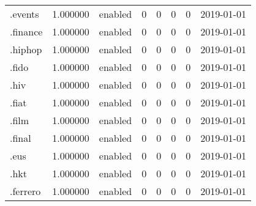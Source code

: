 \begin{tabular}{lrlrrrrl}
.events                   &          1.000000 &         enabled &                           0 &                           0 &                           0 &                   0 &           2019-01-01 \\
.finance                  &          1.000000 &         enabled &                           0 &                           0 &                           0 &                   0 &           2019-01-01 \\
.hiphop                   &          1.000000 &         enabled &                           0 &                           0 &                           0 &                   0 &           2019-01-01 \\
.fido                     &          1.000000 &         enabled &                           0 &                           0 &                           0 &                   0 &           2019-01-01 \\
.hiv                      &          1.000000 &         enabled &                           0 &                           0 &                           0 &                   0 &           2019-01-01 \\
.fiat                     &          1.000000 &         enabled &                           0 &                           0 &                           0 &                   0 &           2019-01-01 \\
.film                     &          1.000000 &         enabled &                           0 &                           0 &                           0 &                   0 &           2019-01-01 \\
.final                    &          1.000000 &         enabled &                           0 &                           0 &                           0 &                   0 &           2019-01-01 \\
.eus                      &          1.000000 &         enabled &                           0 &                           0 &                           0 &                   0 &           2019-01-01 \\
.hkt                      &          1.000000 &         enabled &                           0 &                           0 &                           0 &                   0 &           2019-01-01 \\
.ferrero                  &          1.000000 &         enabled &                           0 &                           0 &                           0 &                   0 &           2019-01-01 \\

\end{tabular}
